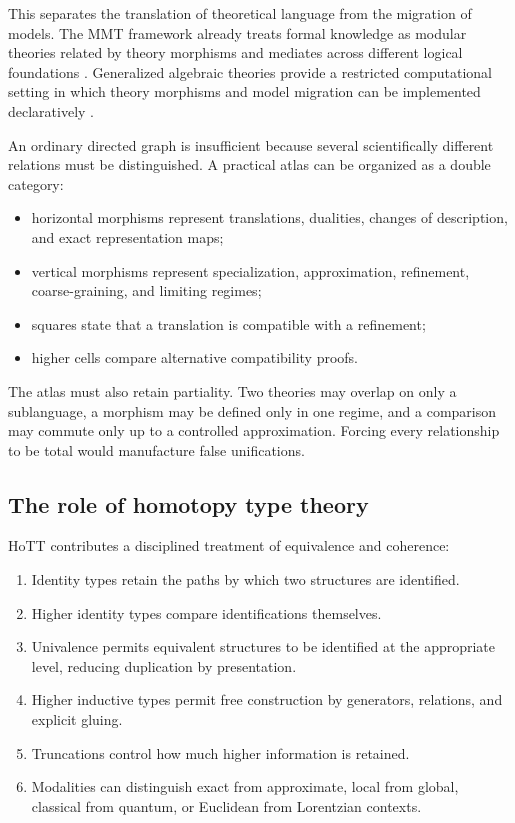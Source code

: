 \documentclass[11pt]{article}
\begin{document}
This separates the translation of theoretical language from the migration of models. The MMT
framework already treats formal knowledge as modular theories related by theory morphisms and
mediates across different logical foundations \cite{rabe2016}. Generalized algebraic theories provide
a restricted computational setting in which theory morphisms and model migration can be implemented
declaratively \cite{gatlab}.

An ordinary directed graph is insufficient because several scientifically different relations must be
distinguished. A practical atlas can be organized as a double category:
\begin{itemize}
  \item horizontal morphisms represent translations, dualities, changes of description, and exact
  representation maps;
  \item vertical morphisms represent specialization, approximation, refinement, coarse-graining, and
  limiting regimes;
  \item squares state that a translation is compatible with a refinement;
  \item higher cells compare alternative compatibility proofs.
\end{itemize}

The atlas must also retain partiality. Two theories may overlap on only a sublanguage, a morphism may
be defined only in one regime, and a comparison may commute only up to a controlled approximation.
Forcing every relationship to be total would manufacture false unifications.

\subsection{The role of homotopy type theory}

HoTT contributes a disciplined treatment of equivalence and coherence:
\begin{enumerate}
  \item Identity types retain the paths by which two structures are identified.
  \item Higher identity types compare identifications themselves.
  \item Univalence permits equivalent structures to be identified at the appropriate level, reducing
  duplication by presentation.
  \item Higher inductive types permit free construction by generators, relations, and explicit gluing.
  \item Truncations control how much higher information is retained.
  \item Modalities can distinguish exact from approximate, local from global, classical from quantum,
  or Euclidean from Lorentzian contexts.
\end{enumerate}
\end{document}
